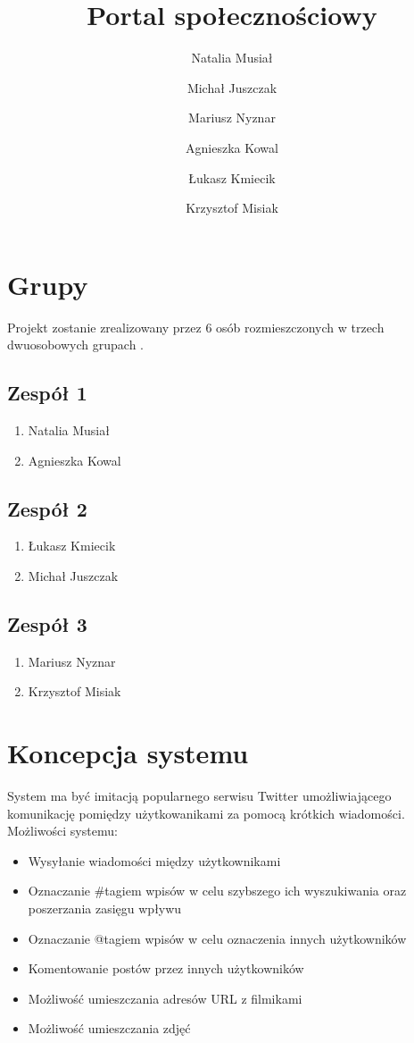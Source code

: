 \documentclass[a4paper]{article}
\title{Portal społecznościowy}
\author{ Natalia Musiał \and Michał Juszczak \and Mariusz Nyznar\and  Agnieszka Kowal \and Łukasz Kmiecik \and Krzysztof Misiak}
\begin{document}
\maketitle


\section{Grupy}

Projekt zostanie zrealizowany przez 6 osób rozmieszczonych w trzech dwuosobowych grupach .
\subsection{Zespół 1}
\begin{enumerate}
\item Natalia Musiał
\item Agnieszka Kowal
\end{enumerate}
\subsection{Zespół 2}
\begin{enumerate}
\item Łukasz Kmiecik
\item Michał Juszczak
\end{enumerate}
\subsection{Zespół 3}
\begin{enumerate}
\item Mariusz Nyznar
\item Krzysztof Misiak

\end{enumerate}


\section{Koncepcja systemu}

System ma być imitacją popularnego serwisu Twitter umożliwiającego komunikację pomiędzy użytkowanikami za pomocą krótkich wiadomości.
Możliwości systemu:
\begin{itemize}
\item Wysyłanie wiadomości między użytkownikami
\item Oznaczanie \#tagiem wpisów w celu szybszego ich wyszukiwania oraz poszerzania zasięgu wpływu
\item Oznaczanie @tagiem wpisów w celu oznaczenia innych użytkowników
\item Komentowanie postów przez innych użytkowników
\item Możliwość umieszczania adresów URL z filmikami
\item Możliwość umieszczania zdjęć

\end{itemize}
\end{document}
